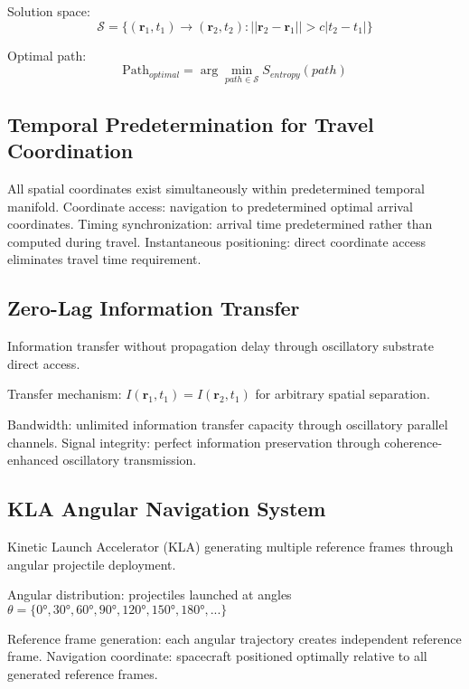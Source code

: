 \documentclass[12pt,a4paper]{article}
\begin{document}
Solution space:
\begin{equation}
\mathcal{S} = \{(\mathbf{r}_1, t_1) \to (\mathbf{r}_2, t_2) : ||\mathbf{r}_2 - \mathbf{r}_1|| > c|t_2 - t_1|\}
\end{equation}

Optimal path:
\begin{equation}
\text{Path}_{optimal} = \arg \min_{path \in \mathcal{S}} S_{entropy}(path)
\end{equation}

\subsection{Temporal Predetermination for Travel Coordination}

All spatial coordinates exist simultaneously within predetermined temporal manifold. Coordinate access: navigation to predetermined optimal arrival coordinates. Timing synchronization: arrival time predetermined rather than computed during travel. Instantaneous positioning: direct coordinate access eliminates travel time requirement.

\subsection{Zero-Lag Information Transfer}

Information transfer without propagation delay through oscillatory substrate direct access.

Transfer mechanism: $I(\mathbf{r}_1, t_1) = I(\mathbf{r}_2, t_1)$ for arbitrary spatial separation.

Bandwidth: unlimited information transfer capacity through oscillatory parallel channels. Signal integrity: perfect information preservation through coherence-enhanced oscillatory transmission.

\subsection{KLA Angular Navigation System}

Kinetic Launch Accelerator (KLA) generating multiple reference frames through angular projectile deployment.

Angular distribution: projectiles launched at angles $\theta = \{0°, 30°, 60°, 90°, 120°, 150°, 180°, ...\}$

Reference frame generation: each angular trajectory creates independent reference frame. Navigation coordinate: spacecraft positioned optimally relative to all generated reference frames.
\end{document}
